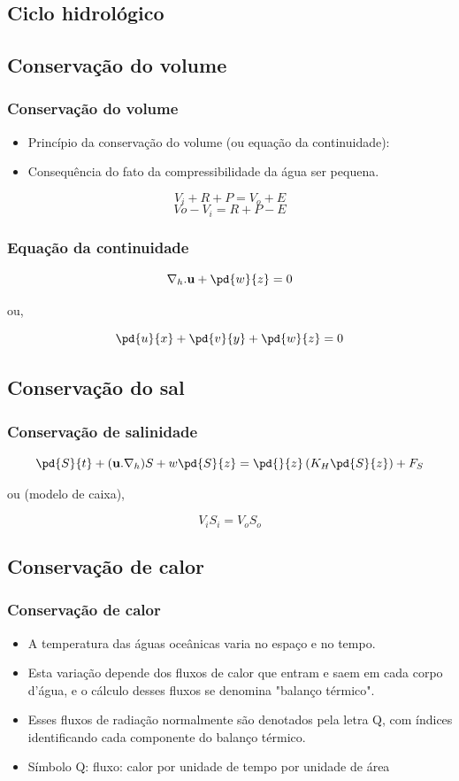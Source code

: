 \subsection{Ciclo hidrológico}

\subsection{Conservação do volume}
\begin{frame}
\frametitle{Conservação do volume}
  \begin{itemize}[<+-| alert@+>]
    \item Princípio da conservação do volume (ou equação da continuidade):
    \item Consequência do fato da compressibilidade da água ser pequena.
  \end{itemize}
  \begin{block}{}
  \[
    V_i + R + P = V_o + E
  \]
  \[
    Vo - V_i = R + P - E
  \]
  \end{block}
\end{frame}


\begin{frame}
\frametitle{Equação da continuidade}
\[
  \nabla_h . \mathbf{u} + \pd{w}{z} = 0
\]

ou,

\[
  \pd{u}{x} + \pd{v}{y} + \pd{w}{z} = 0
\]
\end{frame}


\subsection{Conservação do sal}
\begin{frame}
\frametitle{Conservação de salinidade}
\[
  \pd{S}{t} + (\mathbf{u} . \nabla_h)S + w\pd{S}{z} = \pd{}{z}\left( K_H\pd{S}{z} \right) + F_S
\]

ou (modelo de caixa),
\begin{block}{}
\[
  V_iS_i = V_oS_o
\]
\end{block}
\end{frame}


\subsection{Conservação de calor}
\begin{frame}
  \frametitle{Conservação de calor}
  \begin{itemize}[<+-| alert@+>]
  \item A temperatura das águas oceânicas varia no espaço e no tempo.
  \item Esta variação depende dos fluxos de calor que entram e saem em cada
        corpo d'água, e o cálculo desses fluxos se denomina "balanço térmico".
  \item Esses fluxos de radiação normalmente são denotados pela letra Q,
        com índices identificando cada componente do balanço térmico.
  \item Símbolo Q: fluxo: calor por unidade de tempo por unidade de área
  \end{itemize}
\end{frame}

